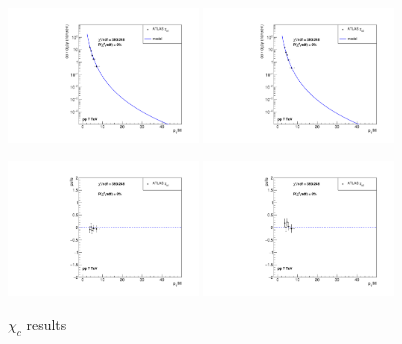 \documentclass{article}
\begin{document}
\begin{figure}
\centering
\includegraphics[width = 0.45\textwidth]{chic1_cs.pdf}
\includegraphics[width = 0.45\textwidth]{chic2_cs.pdf}

\includegraphics[width = 0.45\textwidth]{chic1_pull.pdf}
\includegraphics[width = 0.45\textwidth]{chic2_pull.pdf}
\caption{$\chi_c$ results}
\end{figure}

\clearpage
\end{document}
